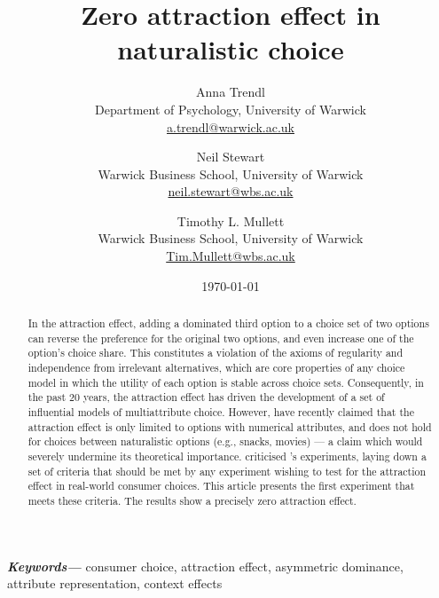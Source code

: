 \documentclass[12pt, a4paper]{article}
\title{}
\author{}
\date{}
\providecommand{\keywords}[1]{\textbf{\textit{Keywords---}} #1}
\begin{document}
\title{Zero attraction effect in naturalistic choice}

\author{Anna Trendl\\Department of Psychology, University of Warwick  \\  \href{mailto:a.trendl@warwick.ac.uk}{a.trendl@warwick.ac.uk} 
\and Neil Stewart \\Warwick Business School, University of Warwick \\  \href{mailto:neil.stewart@wbs.ac.uk}{neil.stewart@wbs.ac.uk} 
\and Timothy L. Mullett\\Warwick Business School, University of Warwick\\  \href{mailto:Tim.Mullett@wbs.ac.uk}{Tim.Mullett@wbs.ac.uk} } 

\date{\today}


\begin{titlepage}
\maketitle

\newpage

\begin{abstract}
In the attraction effect, adding a dominated third option to a choice set of two options can reverse the preference for the original two options, and even increase one of the option's choice share. This constitutes a violation of the axioms of regularity and independence from irrelevant alternatives, which are core properties of any choice model in which the utility of each option is stable across choice sets. Consequently, in the past 20 years, the attraction effect has driven the development of a set of influential models of multiattribute choice. However,  have recently claimed that the attraction effect is only limited to options with numerical attributes, and does not hold for choices between naturalistic options (e.g., snacks, movies) --- a claim which would severely undermine its theoretical importance.  criticised \citeauthor{Frederick2014}'s experiments, laying down a set of criteria that should be met by any experiment wishing to test for the attraction effect in real-world consumer choices. This article presents the first experiment that meets these criteria. The results show a precisely zero attraction effect.
\end{abstract}
\keywords{consumer choice, attraction effect, asymmetric dominance, attribute representation,  context effects}


\end{titlepage}
\end{document}
